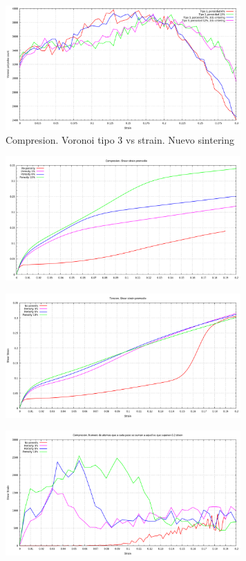 \documentclass[10pt, oneside]{article} %
\begin{document}
\begin{figure}[H]
\centering
\includegraphics[width=9cm]{Figures/Porosidad_newSinter_voronoi3.png}
\caption{Compresion. Voronoi tipo 3 vs strain. Nuevo sintering}
\end{figure}

\begin{figure}[H]
\centering
\includegraphics[width=9cm]{Figures/Porosidad_ss_1.png}
\caption{}
\end{figure}

\begin{figure}[H]
\centering
\includegraphics[width=9cm]{Figures/Porosidad_ss_2.png}
\caption{}
\end{figure}

\begin{figure}[H]
\centering
\includegraphics[width=9cm]{Figures/Porosidad_ss_3.png}
\caption{}
\end{figure}
\end{document}
